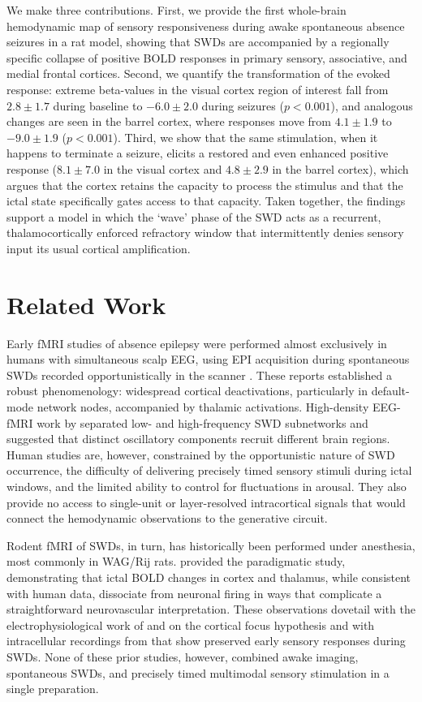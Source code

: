 \documentclass[11pt]{article}
\begin{document}
We make three contributions. First, we provide the first whole-brain hemodynamic map of sensory responsiveness during awake spontaneous absence seizures in a rat model, showing that SWDs are accompanied by a regionally specific collapse of positive BOLD responses in primary sensory, associative, and medial frontal cortices. Second, we quantify the transformation of the evoked response: extreme beta-values in the visual cortex region of interest fall from $2.8 \pm 1.7$ during baseline to $-6.0 \pm 2.0$ during seizures ($p<0.001$), and analogous changes are seen in the barrel cortex, where responses move from $4.1 \pm 1.9$ to $-9.0 \pm 1.9$ ($p<0.001$). Third, we show that the same stimulation, when it happens to terminate a seizure, elicits a restored and even enhanced positive response ($8.1 \pm 7.0$ in the visual cortex and $4.8 \pm 2.9$ in the barrel cortex), which argues that the cortex retains the capacity to process the stimulus and that the ictal state specifically gates access to that capacity. Taken together, the findings support a model in which the `wave' phase of the SWD acts as a recurrent, thalamocortically enforced refractory window that intermittently denies sensory input its usual cortical amplification.

\section{Related Work}

Early fMRI studies of absence epilepsy were performed almost exclusively in humans with simultaneous scalp EEG, using EPI acquisition during spontaneous SWDs recorded opportunistically in the scanner \citep{gotman2005,moeller2008}. These reports established a robust phenomenology: widespread cortical deactivations, particularly in default-mode network nodes, accompanied by thalamic activations. High-density EEG-fMRI work by \citet{tenney2014} separated low- and high-frequency SWD subnetworks and suggested that distinct oscillatory components recruit different brain regions. Human studies are, however, constrained by the opportunistic nature of SWD occurrence, the difficulty of delivering precisely timed sensory stimuli during ictal windows, and the limited ability to control for fluctuations in arousal. They also provide no access to single-unit or layer-resolved intracortical signals that would connect the hemodynamic observations to the generative circuit.

Rodent fMRI of SWDs, in turn, has historically been performed under anesthesia, most commonly in WAG/Rij rats. \citet{mishra2011} provided the paradigmatic study, demonstrating that ictal BOLD changes in cortex and thalamus, while consistent with human data, dissociate from neuronal firing in ways that complicate a straightforward neurovascular interpretation. These observations dovetail with the electrophysiological work of \citet{polack2007} and \citet{meeren2002} on the cortical focus hypothesis and with intracellular recordings from \citet{chipaux2013} that show preserved early sensory responses during SWDs. None of these prior studies, however, combined awake imaging, spontaneous SWDs, and precisely timed multimodal sensory stimulation in a single preparation.
\end{document}
